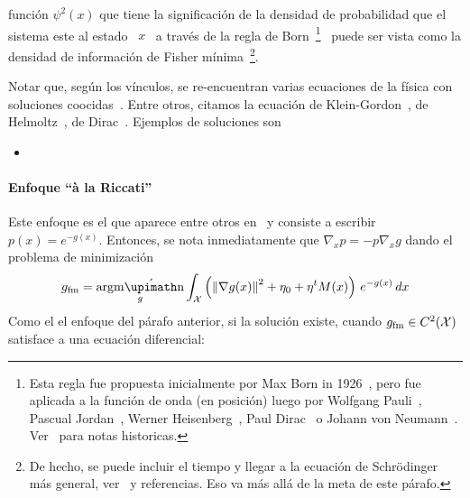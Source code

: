 funci\'on  $\psi^2(x)$   que  tiene  la   significaci\'on  de  la   densidad  de
probabilidad que  el sistema este al  estado \ $x$ \  a trav\'es de la  regla de
Born~\footnote{Esta   regla  fue   propuesta  inicialmente   por  Max   Born  in
1926~\cite{Bor26,  Omn94},  pero  fue  aplicada  a  la  funci\'on  de  onda  (en
posici\'on)     luego      por     Wolfgang      Pauli~\cite{Pau27},     Pascual
Jordan~\cite{Jor27:09,    Jor27:11},   Werner    Heisenberg~\cite{Hei27},   Paul
Dirac~\cite{Dir27} o Johann  von Neumann~\cite{Neu32}.  Ver~\cite{MehRec00} para
notas   historicas.}~\cite{Bor26}  puede   ser   vista  como   la  densidad   de
informaci\'on de Fisher m\'inima~\footnote{De hecho,  se puede incluir el tiempo
y llegar a la ecuaci\'on de Schr\"odinger m\'as general, ver~\cite{Fri98, Fri04}
y referencias.  Eso va m\'as all\'a de la meta de este p\'arafo.}.

Notar  que, seg\'un  los v\'inculos,  se re-encuentran  varias ecuaciones  de la
f\'isica con  soluciones coocidas~\cite{Fri98, Fri04}.  Entre  otros, citamos la
ecuaci\'on   de   Klein-Gordon~\cite{Fri90,    FriSof95,   Fri98,   Fri04},   de
Helmoltz~\cite{Fri90, FriSof95,  Fri98, Fri04}, de  Dirac~\cite{FriSof95, Fri98,
Fri04}. Ejemplos de soluciones son
%
\begin{itemize}
\item {}
\end{itemize}




\paragraph{Enfoque ``\`a la Riccati''}

Este enfoque es  el que aparece entre otros  en~\cite{BorLew96, BorLew95, Ziv98,
FriPla99}  y consiste  a escribir  \ $p(x)  = e^{  - g(x)}$.  Entonces, se  nota
inmediatamente  que  $\nabla_x  p  =  -  p \nabla_x  g$  dando  el  problema  de
minimizaci\'on
%
\[
g_{\mathrm{fm}} = \argmin_g \int_\X  \left( \left\| \nabla g(x) \right\|^2 + \eta_0  
  + \eta^t M(x) \right) \, e^{- g(x) } \, dx
\]
%
Como  el el  enfoque  del p\'arafo  anterior, si  la  soluci\'on existe,  cuando
$g_{\mathrm{fm}} \in C^2(\mathcal{X})$ satisface a una ecuaci\'on diferencial:
%

